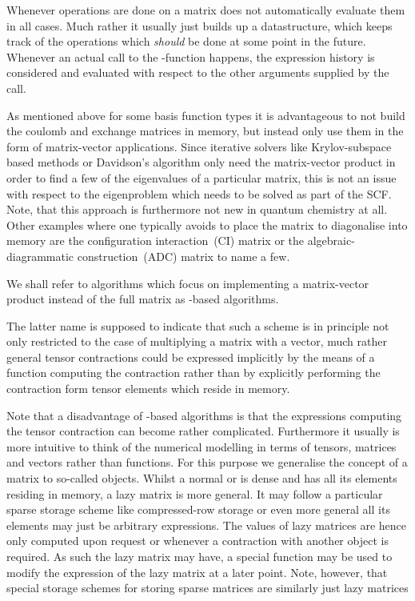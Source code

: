 Whenever operations are done on a matrix \lazyten does not automatically
evaluate them in all cases.
Much rather it usually just builds up a datastructure,
which keeps track of the operations which \textit{should} be done
at some point in the future.
Whenever an actual call to the \contraction-function happens,
the expression history is considered and evaluated with respect
to the other arguments supplied by the \contraction call.


As mentioned above for some basis function types it is advantageous
to not build the coulomb and exchange matrices in memory,
but instead only use them in the form of matrix-vector applications.
Since iterative solvers like Krylov-subspace based methods or Davidson's algorithm
only need the matrix-vector product in order to find a few of the eigenvalues
of a particular matrix,
this is not an issue with respect to the eigenproblem which needs to be solved
as part of the SCF.
Note, that this approach is furthermore not new in quantum chemistry at all.
Other examples where one typically avoids to place the matrix to diagonalise
into memory are the configuration interaction~(CI) matrix
or the algebraic-diagrammatic construction~(ADC) matrix to name a few.

We shall refer to algorithms which focus on implementing a matrix-vector product
instead of the full matrix as \contraction-based algorithms.

The latter name is supposed to indicate that such a scheme is in principle
not only restricted to the case of multiplying a matrix with a vector,
much rather general tensor contractions could be expressed implicitly
by the means of a function computing the contraction rather than
by explicitly performing the contraction form tensor elements
which reside in memory.

Note that a disadvantage of \contraction-based algorithms is that the expressions
computing the tensor contraction can become rather complicated.
Furthermore it usually is more intuitive to think of the
numerical modelling in terms of tensors, matrices and vectors
rather than \contraction functions.
For this purpose we generalise the concept of a matrix
to so-called  objects.
Whilst a normal or  is dense and has all its elements
residing in memory,
a lazy matrix is more general.
It may follow a particular sparse storage scheme
like compressed-row storage
or even more general all its elements may just be arbitrary expressions.
The values of lazy matrices are hence only computed upon request
or whenever a contraction with another object is required.
As such the lazy matrix may have, \ie a special \update function
may be used to modify the expression of the lazy matrix
at a later point.
Note, however, that special storage schemes for storing
sparse matrices are similarly just lazy matrices 

